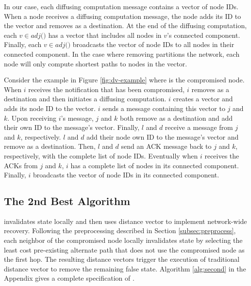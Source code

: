 In our case, each diffusing computation message contains a vector of node IDs.  When 
a node receives a diffusing computation message, the node adds its ID to the vector and removes \bad as a destination. At the end of the diffusing computation, 
each $v \in adj($\bads$)$ has a vector that includes all nodes in $v$'s connected component. Finally, each $v \in adj($\bads$)$ broadcasts the vector of node IDs to 
all nodes in their connected component. In the case where removing \bad partitions the network, each node will only compute shortest paths to nodes in the vector. 

Consider the example in Figure \ref{fig:dv-example} where \bad is the compromised node. 
When $i$ receives the notification that \bad has been compromised, $i$ removes \bad as a destination and then initiates a diffusing computation. 
$i$ creates a vector and adds its node ID to the vector. $i$ sends a message containing this vector to $j$ and $k$.  Upon receiving $i$'s message,
$j$ and $k$ both remove \bad as a destination and add their own ID to the message's vector.  Finally, $l$ and $d$ receive a message from $j$ and $k$, respectively.  
$l$ and $d$ add their node own ID to the message's vector and remove \bad as a destination. Then, $l$ and $d$ send an ACK message back to $j$ and $k$, respectively, with the complete 
list of node IDs. Eventually when $i$ receives the ACKs from $j$ and $k$, $i$ has a complete list of nodes in its connected component. Finally, $i$ broadcasts the vector of node IDs
in its connected component. 


\subsection{The 2nd Best Algorithm}
\label{subsec:second}
\second invalidates state locally and then uses distance vector to implement network-wide recovery.  Following the preprocessing described in Section \ref{subsec:preprocess}, 
each neighbor of the compromised node locally invalidates state by selecting the least cost pre-existing alternate path that does not use the compromised node as the first hop.
The resulting distance vectors trigger the execution of traditional distance vector to remove the remaining false state.
Algorithm \ref{alg:second} in the Appendix gives a complete specification of \seconds.

